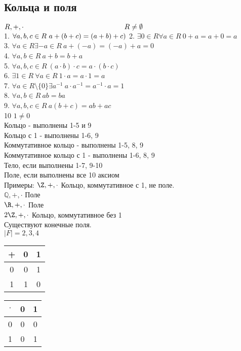 \subsection{Кольца и поля}

$ R, +, \cdot \hspace*{5cm} R \neq \emptyset $ \\
1. $ \forall a,b,c \in R \ a + (b + c) = (a +b) + c) \\$
2. $ \exists 0 \in R \forall a \in R \ 0+a=a+0=a $ \\
3. $ \forall a \in R \exists -a \in R \ a+(-a)=(-a)+a=0$ \\
4. $ \forall a,b \in R \ a+b=b+a $ \\
5. $ \forall a, b, c \in R \ (a \cdot b) \cdot c = a \cdot (b \cdot c) $ \\
6. $ \exists 1 \in R \ \forall a \in R \ 1 \cdot a = a \cdot 1 = a $ \\
7. $ \forall a \in R \setminus \{0\} \exists a^{-1} \ a \cdot a^{-1} = a^{-1} \cdot a = 1 $ \\
8. $ \forall a, b \in R \ ab=ba$ \\
9. $ \forall a,b,c \in R \ a(b+c) = ab+ac $ \\
10 $ 1 \neq 0 $ \\
Кольцо - выполнены 1-5 и 9 \\
Кольцо с 1 - выполнены 1-6, 9 \\
Коммутативное кольцо - выполнены 1-5, 8, 9 \\
Коммутативное кольцо с 1 - выполнены 1-6, 8, 9 \\
Тело, если выполнены 1-7, 9-10 \\
Поле, если выполнены все 10 аксиом \\
Примеры:
$ \Z, +, \cdot $ Кольцо, коммутативное с 1, не поле. \\
$ \mathbb{Q}, +, \cdot $ Поле \\
$ \R, +, \cdot $ Поле \\
$ 2\Z , +, \cdot $ Кольцо, коммутативное без 1 \\
Существуют конечные поля.\\
$ |F| = 2,3,4$ \\
\begin{tabular}{|c|c|c|}
	\hline 
+	& 0 & 1 \\ 
	\hline 
0	& 0 & 1 \\ 
	\hline 
1	& 1 & 0 \\ 
	\hline 
\end{tabular} 
\begin{tabular}{|c|c|c|}
	\hline 
	$\cdot$	& 0 & 1 \\ 
	\hline 
	0	& 0 & 0  \\ 
	\hline 
	1	&  0 & 1 \\ 
	\hline 
\end{tabular} \\
